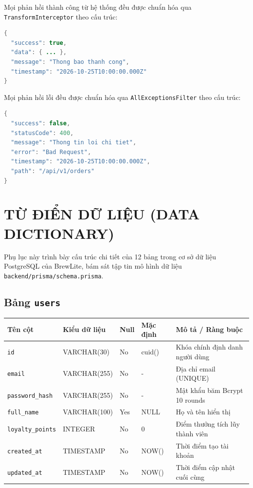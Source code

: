 \documentclass[12pt,a4paper,oneside]{report}
\begin{document}
Mọi phản hồi thành công từ hệ thống đều được chuẩn hóa qua \texttt{TransformInterceptor} theo cấu trúc:
\begin{lstlisting}[language=Java]
{
  "success": true,
  "data": { ... },
  "message": "Thong bao thanh cong",
  "timestamp": "2026-10-25T10:00:00.000Z"
}
\end{lstlisting}

Mọi phản hồi lỗi đều được chuẩn hóa qua \texttt{AllExceptionsFilter} theo cấu trúc:
\begin{lstlisting}[language=Java]
{
  "success": false,
  "statusCode": 400,
  "message": "Thong tin loi chi tiet",
  "error": "Bad Request",
  "timestamp": "2026-10-25T10:00:00.000Z",
  "path": "/api/v1/orders"
}
\end{lstlisting}



\chapter{TỪ ĐIỂN DỮ LIỆU (DATA DICTIONARY)}
\label{app:data-dictionary}

Phụ lục này trình bày cấu trúc chi tiết của 12 bảng trong cơ sở dữ liệu PostgreSQL của BrewLite, bám sát tập tin mô hình dữ liệu \texttt{backend/prisma/schema.prisma}.

\section{Bảng \texttt{users}}
\begin{table}[H]
\centering
\small
\begin{tabularx}{\textwidth}{llllX}
\toprule
\textbf{Tên cột} & \textbf{Kiểu dữ liệu} & \textbf{Null} & \textbf{Mặc định} & \textbf{Mô tả / Ràng buộc} \\
\midrule
\texttt{id} & VARCHAR(30) & No & cuid() & Khóa chính định danh người dùng \\
\texttt{email} & VARCHAR(255) & No & - & Địa chỉ email (UNIQUE) \\
\texttt{password\_hash} & VARCHAR(255) & No & - & Mật khẩu băm Bcrypt 10 rounds \\
\texttt{full\_name} & VARCHAR(100) & Yes & NULL & Họ và tên hiển thị \\
\texttt{loyalty\_points} & INTEGER & No & 0 & Điểm thưởng tích lũy thành viên \\
\texttt{created\_at} & TIMESTAMP & No & NOW() & Thời điểm tạo tài khoản \\
\texttt{updated\_at} & TIMESTAMP & No & NOW() & Thời điểm cập nhật cuối cùng \\
\bottomrule
\end{tabularx}
\end{table}
\end{document}
